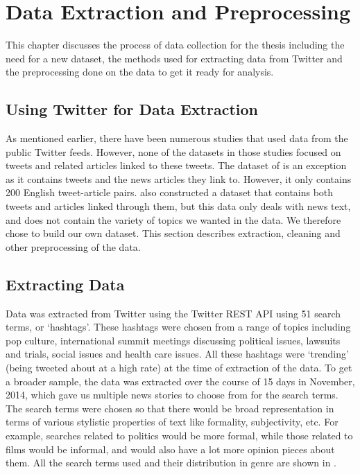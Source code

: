\chapter{Data Extraction and Preprocessing}
\label{chap:data}

This chapter discusses the process of data collection for the thesis including the need for a new dataset, the methods used for extracting data from Twitter and the preprocessing done on the data to get it ready for analysis. 


\section{Using Twitter for Data Extraction}

As mentioned earlier, there have been numerous studies that used data from the public Twitter feeds. However, none of the datasets in those studies focused on tweets and related articles linked to these tweets. The dataset of \cite{lloret2013towards} is an exception as it contains tweets and the news articles they link to. However, it only contains 200 English tweet-article pairs. \cite{wei2014utilizing} also constructed a dataset that contains both tweets and articles linked through them, but this data only deals with news text, and does not contain the variety of topics we wanted in the data. We therefore chose to build our own dataset. This section describes extraction, cleaning and other preprocessing of the data.

\section{Extracting Data}

Data was extracted from Twitter using the Twitter REST API using 51 search terms, or `hashtags'. These hashtags were chosen from a range of topics including pop culture,  international summit meetings discussing political issues, lawsuits and trials, social issues and health care issues. All these hashtags were `trending' (being tweeted about at a high rate) at the time of extraction of the data. To get a broader sample, the data was extracted over the course of 15 days in November, 2014, which gave us multiple news stories to choose from for the search terms. The search terms were chosen so that there would be broad representation in terms of various stylistic properties of text like formality, subjectivity, etc. For example, searches related to politics would be more formal, while those related to films would be informal, and would also have a lot more opinion pieces about them. All the search terms used and their distribution in genre are shown in .

